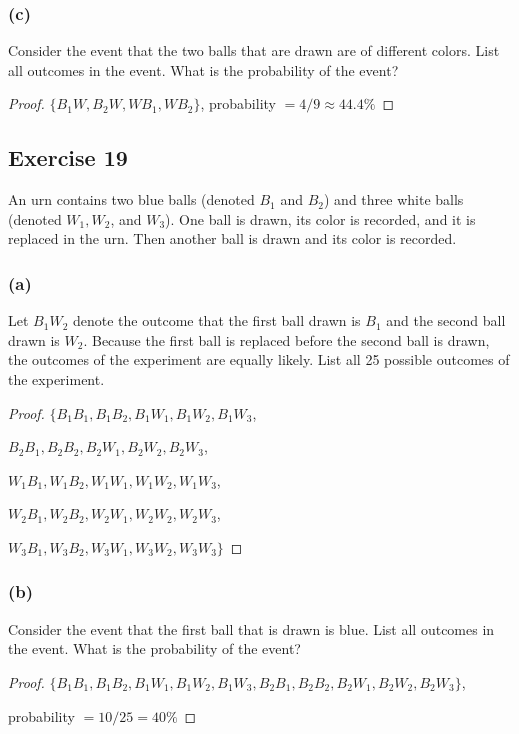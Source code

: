 \documentclass[14pt]{extarticle}
\begin{document}
\subsubsection{(c)}
Consider the event that the two balls that are drawn are of different colors. List all outcomes in the event. 
What is the probability of the event?

\begin{proof}
\(\{B_1W, B_2W, WB_1, WB_2\}\), probability \(= 4/9 \approx 44.4\%\)
\end{proof}

\subsection{Exercise 19}
An urn contains two blue balls (denoted \(B_1\) and \(B_2\)) and three white balls (denoted \(W_1, W_2\), and 
\(W_3\)). One ball is drawn, its color is recorded, and it is replaced in the urn. Then another ball is drawn and its 
color is recorded.

\subsubsection{(a)}
Let \(B_1 W_2\) denote the outcome that the first ball drawn is \(B_1\) and the second ball drawn is \(W_2\). 
Because the first ball is replaced before the second ball is drawn, the outcomes of the experiment are equally 
likely. List all 25 possible outcomes of the experiment.

\begin{proof}
\(\{B_1B_1, B_1B_2, B_1W_1, B_1W_2, B_1W_3\), 

\(B_2B_1, B_2B_2, B_2W_1, B_2W_2, B_2W_3\), 

\(W_1B_1, W_1B_2, W_1W_1, W_1W_2, W_1W_3\), 

\(W_2B_1, W_2B_2, W_2W_1, W_2W_2, W_2W_3\), 

\(W_3B_1, W_3B_2, W_3W_1, W_3W_2, W_3W_3\}\)
\end{proof}

\subsubsection{(b)}
Consider the event that the first ball that is drawn is blue. List all outcomes in the event. 
What is the probability of the event?

\begin{proof}
\(\{B_1B_1, B_1B_2, B_1W_1, B_1W_2, B_1W_3, B_2B_1, B_2B_2, B_2W_1, B_2W_2, B_2W_3\}\), 

probability \(= 10/25 = 40\%\)
\end{proof}
\end{document}
